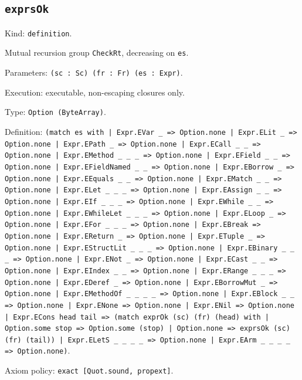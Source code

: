 \documentclass[11pt]{article}
\begin{document}
\subsection*{\texttt{exprsOk}}
\noindent Kind: \texttt{definition}.\par
\noindent Mutual recursion group \texttt{CheckRt}, decreasing on \texttt{es}.\par
\noindent Parameters: \texttt{(sc : Sc) (fr : Fr) (es : Expr)}.\par
\noindent Execution: executable, non-escaping closures only.\par
\noindent Type: \texttt{Option (ByteArray)}.\par
\noindent Definition: \texttt{(match es with | Expr.EVar \_ => Option.none | Expr.ELit \_ => Option.none | Expr.EPath \_ => Option.none | Expr.ECall \_ \_ => Option.none | Expr.EMethod \_ \_ \_ => Option.none | Expr.EField \_ \_ => Option.none | Expr.EFieldNamed \_ \_ => Option.none | Expr.EBorrow \_ => Option.none | Expr.EEquals \_ \_ => Option.none | Expr.EMatch \_ \_ => Option.none | Expr.ELet \_ \_ \_ => Option.none | Expr.EAssign \_ \_ => Option.none | Expr.EIf \_ \_ \_ => Option.none | Expr.EWhile \_ \_ => Option.none | Expr.EWhileLet \_ \_ \_ => Option.none | Expr.ELoop \_ => Option.none | Expr.EFor \_ \_ \_ => Option.none | Expr.EBreak => Option.none | Expr.EReturn \_ => Option.none | Expr.ETuple \_ => Option.none | Expr.EStructLit \_ \_ \_ => Option.none | Expr.EBinary \_ \_ \_ => Option.none | Expr.ENot \_ => Option.none | Expr.ECast \_ \_ => Option.none | Expr.EIndex \_ \_ => Option.none | Expr.ERange \_ \_ \_ => Option.none | Expr.EDeref \_ => Option.none | Expr.EBorrowMut \_ => Option.none | Expr.EMethodOf \_ \_ \_ \_ => Option.none | Expr.EBlock \_ \_ => Option.none | Expr.ENone => Option.none | Expr.ENil => Option.none | Expr.ECons head tail => (match exprOk (sc) (fr) (head) with | Option.some stop => Option.some (stop) | Option.none => exprsOk (sc) (fr) (tail)) | Expr.ELetS \_ \_ \_ \_ => Option.none | Expr.EArm \_ \_ \_ \_ => Option.none)}.\par
\noindent Axiom policy: \texttt{exact [Quot.sound, propext]}.\par
\end{document}
